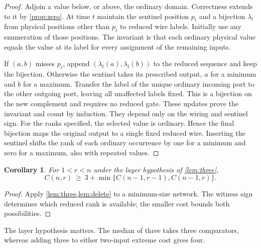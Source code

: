 \documentclass[11pt,reqno]{amsart}
\newtheorem{corollary}[theorem]{Corollary}
\begin{document}
\begin{proof}
Adjoin a value below, or above, the ordinary domain. Correctness extends
to it by \cref{prop:zero}. At time $t$ maintain the sentinel position $p_t$
and a bijection $\lambda_t$ from physical positions other than $p_t$ to
reduced wire labels. Initially use any enumeration of those positions.
The invariant is that each ordinary physical value equals the value at its
label for every assignment of the remaining inputs.

If $(a,b)$ misses $p_t$, append $(\lambda_t(a),\lambda_t(b))$ to the
reduced sequence and keep the bijection. Otherwise the sentinel takes its
prescribed output, $a$ for a minimum and $b$ for a maximum. Transfer the
label of the unique ordinary incoming port to the other outgoing port,
leaving all unaffected labels fixed. This is a bijection on the new
complement and requires no reduced gate. These updates prove the invariant
and count by induction. They depend only on the wiring and sentinel sign.
For the ranks specified, the selected value is ordinary. Hence the final
bijection maps the original output to a single fixed reduced wire.
Inserting the sentinel shifts the rank of each ordinary occurrence by one
for a minimum and zero for a maximum, also with repeated values.
\end{proof}
\begin{corollary}\label{cor:step}
For $1<r<n$ under the layer hypothesis of \cref{lem:three},
\[
 C(n,r)\ \ge\ 3+\min\{C(n-1,r-1),C(n-1,r)\}.
\]
\end{corollary}
\begin{proof}
Apply \cref{lem:three,lem:delete} to a minimum-size network. The witness
sign determines which reduced rank is available; the smaller cost bounds
both possibilities.
\end{proof}
The layer hypothesis matters. The median of three takes three comparators,
whereas adding three to either two-input extreme cost gives four.





\end{document}
